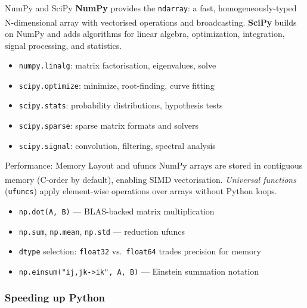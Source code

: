 \begin{v3topic}{NumPy and SciPy}
    \textbf{NumPy} provides the \texttt{ndarray}: a fast, homogeneously-typed N-dimensional array with vectorised operations and broadcasting\textsuperscript{\cite{fuhrerScientificComputingPython2021}}.
    \textbf{SciPy} builds on NumPy and adds algorithms for linear algebra, optimization, integration, signal processing, and statistics.
\visualseparator
    \begin{itemize}
        \item \texttt{numpy.linalg}: matrix factorisation, eigenvalues, solve
        \item \texttt{scipy.optimize}: minimize, root-finding, curve fitting
        \item \texttt{scipy.stats}: probability distributions, hypothesis tests
        \item \texttt{scipy.sparse}: sparse matrix formats and solvers
        \item \texttt{scipy.signal}: convolution, filtering, spectral analysis
    \end{itemize}

\end{v3topic}
\begin{v3topic}{Performance: Memory Layout and ufuncs}
    NumPy arrays are stored in contiguous memory (C-order by default), enabling SIMD vectorisation\textsuperscript{\cite{fuhrerScientificComputingPython2021}}.
    \emph{Universal functions} (\texttt{ufuncs}) apply element-wise operations over arrays without Python loops.
\visualseparator
    \begin{itemize}
        \item \texttt{np.dot(A, B)} --- BLAS-backed matrix multiplication
        \item \texttt{np.sum}, \texttt{np.mean}, \texttt{np.std} --- reduction ufuncs
        \item \texttt{dtype} selection: \texttt{float32} vs.\ \texttt{float64} trades precision for memory
        \item \texttt{np.einsum("ij,jk->ik", A, B)} --- Einstein summation notation
    \end{itemize}
\end{v3topic}

\subsubsection{Speeding up Python}

